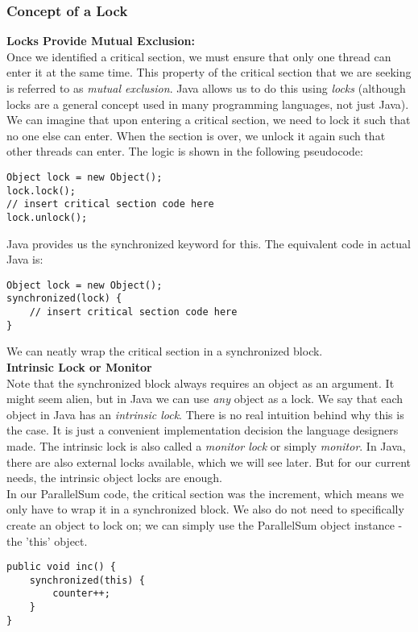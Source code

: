 \documentclass[main.tex]{subfiles}
\begin{document}
\subsubsection{Concept of a Lock}
\textbf{Locks Provide Mutual Exclusion:}\\
Once we identified a critical section, we must ensure that only one thread can enter it at the same time. This property of the critical section that we are seeking is referred to as \textit{mutual exclusion}. Java allows us to do this using \textit{locks} (although locks are a general concept used in many programming languages, not just Java).\\
We can imagine that upon entering a critical section, we need to lock it such that no one else can enter. When the section is over, we unlock it again such that other threads can enter. The logic is shown in the following pseudocode:
\begin{verbatim}
Object lock = new Object();
lock.lock();
// insert critical section code here
lock.unlock();
\end{verbatim}
Java provides us the synchronized keyword for this. The equivalent code in actual Java is:
\begin{verbatim}
Object lock = new Object();
synchronized(lock) {
    // insert critical section code here
}
\end{verbatim}
We can neatly wrap the critical section in a synchronized block.\\[3mm]
\textbf{Intrinsic Lock or Monitor}\\
Note that the synchronized block always requires an object as an argument. It might seem alien, but in Java we can use \textit{any} object as a lock. We say that each object in Java has an \textit{intrinsic lock}. There is no real intuition behind why this is the case. It is just a convenient implementation decision the language designers made. The intrinsic lock is also called a \textit{monitor lock} or simply \textit{monitor}. In Java, there are also external locks available, which we will see later. But for our current needs, the intrinsic object locks are enough.\\[3mm]
In our ParallelSum code, the critical section was the increment, which means we only have to wrap it in a synchronized block. We also do not need to specifically create an object to lock on; we can simply use the ParallelSum object instance - the 'this' object.
\begin{verbatim}
public void inc() {
    synchronized(this) {
        counter++;
    }
}
\end{verbatim}
\end{document}
